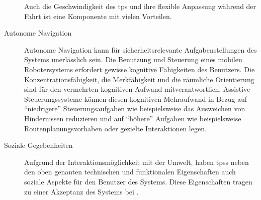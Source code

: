 \begin{description}
Auch die Geschwindigkeit des \acs{tps} und ihre flexible Anpassung während der Fahrt ist eine Komponente mit vielen Vorteilen.
\item[Autonome Navigation] Autonome Navigation kann für sicherheitsrelevante Aufgabenstellungen des Systems unerlässlich sein. Die Benutzung und Steuerung eines mobilen Robotersystems erfordert gewisse kognitive Fähigkeiten des Benutzers. Die Konzentrationsfähigkeit, die Merkfähigkeit und die räumliche Orientierung sind für den vermehrten kognitiven Aufwand mitverantwortlich. Assistive Steuerungssysteme können diesen kognitiven Mehraufwand in Bezug auf \enquote{niedrigere} Steuerungsaufgaben wie beispielsweise das Ausweichen von Hindernissen reduzieren und auf \enquote{höhere} Aufgaben wie beispielsweise Routenplanungsvorhaben oder gezielte Interaktionen legen.  
\item[Soziale Gegebenheiten] Aufgrund der Interaktionsmöglichkeit mit der Umwelt, haben \aclp{tps} neben den oben genanten technischen und funktionalen Eigenschaften auch soziale Aspekte für den Benutzer des Systems. Diese Eigenschaften tragen zu einer Akzeptanz des Systems bei \cite{Goodrich2013}. 
\end{description}


